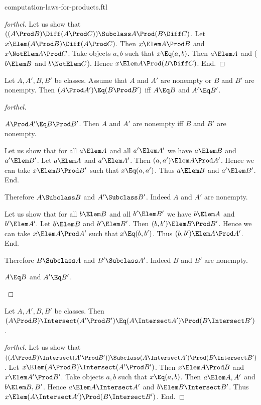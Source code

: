 \documentclass{stex}
\begin{document}
\begin{smodule}{computation-laws-for-products.ftl}
\begin{proof}[forthel]
  Let us show that $((A \Prod B) \Diff (A \Prod C)) \Subclass A \Prod (B \Diff C)$. %
    Let $x \Elem (A \Prod B) \Diff (A \Prod C)$.
    Then $x \Elem A \Prod B$ and $x \NotElem A \Prod C$.
    Take objects $a, b$ such that $x \Eq (a, b)$.
    Then $a \Elem A$ and ($b \Elem B$ and $b \NotElem C$).
    Hence $x \Elem A \Prod (B \Diff C)$.
  End.
\end{proof}

\begin{proposition*}[forthel]
  Let $A, A', B, B'$ be classes.
  Assume that $A$ and $A'$ are nonempty or $B$ and $B'$ are nonempty.
  Then $(A \Prod A') \Eq (B \Prod B')$ iff $A \Eq B$ and $A' \Eq B'$.
\end{proposition*}
\begin{proof}[forthel]
  \begin{case}{$A \Prod A' \Eq B \Prod B'$.}
    Then $A$ and $A'$ are nonempty iff $B$ and $B'$ are nonempty.

    Let us show that for all $a \Elem A$ and all $a' \Elem A'$ we have $a \Elem B$ and $a' \Elem B'$.
      Let $a \Elem A$ and $a' \Elem A'$.
      Then $(a, a') \Elem A \Prod A'$.
      Hence we can take $x \Elem B \Prod B'$ such that $x \Eq (a, a')$.
      Thus $a \Elem B$ and $a' \Elem B'$.
    End.

    Therefore $A \Subclass B$ and $A' \Subclass B'$.
    Indeed $A$ and $A'$ are nonempty.

    Let us show that for all $b \Elem B$ and all $b' \Elem B'$ we have $b \Elem A$ and $b' \Elem A'$.
      Let $b \Elem B$ and $b' \Elem B'$.
      Then $(b, b') \Elem B \Prod B'$.
      Hence we can take $x \Elem A \Prod A'$ such that $x \Eq (b, b')$.
      Thus $(b, b') \Elem A \Prod A'$.
    End.

    Therefore $B \Subclass A$ and $B' \Subclass A'$.
    Indeed $B$ and $B'$ are nonempty.
  \end{case}

  \begin{case}{$A \Eq B$ and $A' \Eq B'$.} \end{case}
\end{proof}

\begin{proposition*}[forthel]
  Let $A, A', B, B'$ be classes.
  Then $(A \Prod B) \Intersect (A' \Prod B') \Eq (A \Intersect A') \Prod (B \Intersect B')$.
\end{proposition*}
\begin{proof}[forthel]
  Let us show that $((A \Prod B) \Intersect (A' \Prod B')) \Subclass (A \Intersect A') \Prod (B \Intersect B')$. %
    Let $x \Elem (A \Prod B) \Intersect (A' \Prod B')$.
    Then $x \Elem A \Prod B$ and $x \Elem A' \Prod B'$.
    Take objects $a, b$ such that $x \Eq (a, b)$.
    Then $a \Elem A, A'$ and $b \Elem B, B'$.
    Hence $a \Elem A \Intersect A'$ and $b \Elem B \Intersect B'$.
    Thus $x \Elem (A \Intersect A') \Prod (B \Intersect B')$.
  End.


\end{proof}
\end{smodule}
\end{document}
